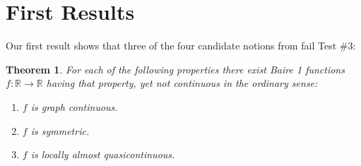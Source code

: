 \documentclass[11pt]{amsart} %
\newtheorem{theorem}{Theorem}[section]
\theoremstyle{definition}
\begin{document}
 
\section{First Results} 
\label{sec:fail} 
Our first result shows that three of the four candidate notions from \cite{11} fail Test \#3:

\begin{theorem} For each of the following properties 
there exist Baire 1 functions \(f:\mathbb R\to\mathbb R\) having that property, yet not continuous in the ordinary sense: 
\begin{enumerate}
    \item \(f\) is graph continuous.
    \item \(f\) is symmetric. 
        \item \(f\) is locally almost quasicontinuous. 
        \end{enumerate}
\end{theorem}
\end{document}
